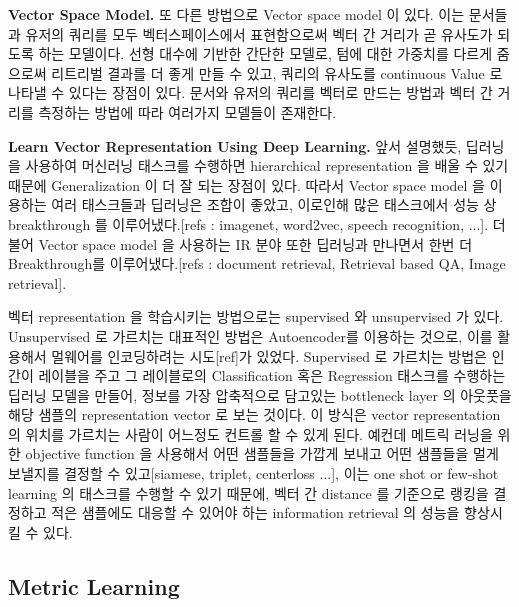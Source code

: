 \textbf{Vector Space Model.} 또 다른 방법으로 Vector space model 이 있다. 이는 문서들과 유저의 쿼리를 모두 벡터스페이스에서 표현함으로써 벡터 간 거리가 곧 유사도가 되도록 하는 모델이다. 선형 대수에 기반한 간단한 모델로, 텀에 대한 가중치를 다르게 줌으로써 리트리벌 결과를 더 좋게 만들 수 있고, 쿼리의 유사도를 continuous Value 로 나타낼 수 있다는 장점이 있다.\cite{salton1975vector} 문서와 유저의 쿼리를 벡터로 만드는 방법\cite{}과 벡터 간 거리를 측정하는 방법\cite{}에 따라 여러가지 모델들이 존재한다.







\textbf{Learn Vector Representation Using Deep Learning.} 앞서 설명했듯, 딥러닝을 사용하여 머신러닝 태스크를 수행하면 hierarchical representation 을 배울 수 있기 때문에 Generalization 이 더 잘 되는 장점이 있다. 따라서 Vector space model 을 이용하는 여러 태스크들과 딥러닝은 조합이 좋았고, 이로인해 많은 태스크에서 성능 상 breakthrough 를 이루어냈다.[refs : imagenet, word2vec, speech recognition, ...]. 더불어 Vector space model 을 사용하는 IR 분야 또한 딥러닝과 만나면서 한번 더 Breakthrough를 이루어냈다.[refs : document retrieval, Retrieval based QA, Image retrieval]. 

벡터 representation 을 학습시키는 방법으로는 supervised 와 unsupervised 가 있다. Unsupervised 로 가르치는 대표적인 방법은 Autoencoder를 이용하는 것으로, 이를 활용해서 멀웨어를 인코딩하려는 시도[ref]가 있었다. Supervised 로 가르치는 방법은 인간이 레이블을 주고 그 레이블로의 Classification 혹은 Regression 태스크를 수행하는 딥러닝 모델을 만들어, 정보를 가장 압축적으로 담고있는 bottleneck layer 의 아웃풋을 해당 샘플의 representation vector 로 보는 것이다. 이 방식은 vector representation 의 위치를 가르치는 사람이 어느정도 컨트롤 할 수 있게 된다. 예컨데 메트릭 러닝을 위한 objective function 을 사용해서 어떤 샘플들을 가깝게 보내고 어떤 샘플들을 멀게 보낼지를 결정할 수 있고[siamese, triplet, centerloss ...], 이는 one shot or few-shot learning 의 태스크를 수행할 수 있기 때문에, 벡터 간 distance 를 기준으로 랭킹을 결정하고 적은 샘플에도 대응할 수 있어야 하는 information retrieval 의 성능을 향상시킬 수 있다. 


\subsection{Metric Learning}


